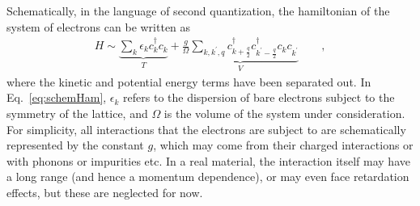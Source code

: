 \par 
Schematically, in the language of second quantization, the hamiltonian of the system of electrons can be written as 
\begin{align}
    H \sim \underbrace{\sum_k \epsilon_k c^\dagger_k c^{\phantom{\dagger}}_k}_{T} + \underbrace{\frac{g}{\Omega}\sum_{k,k^\prime,q} c^\dagger_{k+\frac{q}{2}}c^\dagger_{k^\prime -\frac{q}{2}}c^{\phantom{\dagger}}_k c^{\phantom{\dagger}}_{k^\prime}}_{V} \quad\quad, 
    \label{eq:schemHam}
\end{align}
where the kinetic and potential energy terms have been separated out. In Eq.~\eqref{eq:schemHam}, $\epsilon_k$ refers to the dispersion of bare electrons subject to the symmetry of the lattice, and $\Omega$ is the volume of the system under consideration. For simplicity, all interactions that the electrons are subject to are schematically represented by the constant $g$, which may come from their charged interactions or with phonons or impurities etc. In a real material, the interaction itself may have a long range (and hence a momentum dependence), or may even face retardation effects, but these are neglected for now. 

